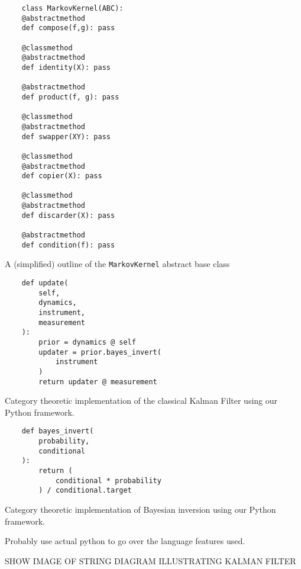 \documentclass[letterpaper, 10 pt, conference]{ieeeconf}  %
\begin{document}
\begin{listing}
\begin{verbatim}
    class MarkovKernel(ABC):
	@abstractmethod
	def compose(f,g): pass

	@classmethod
	@abstractmethod
	def identity(X): pass

	@abstractmethod
	def product(f, g): pass

	@classmethod
	@abstractmethod
	def swapper(XY): pass

	@classmethod
	@abstractmethod
	def copier(X): pass

	@classmethod
	@abstractmethod
	def discarder(X): pass

	@abstractmethod
	def condition(f): pass
\end{verbatim}
    \caption{A (simplified) outline of the \texttt{MarkovKernel} abstract base class}
\label{listing:1}
\end{listing}

\begin{listing}
\begin{verbatim}
    def update(
        self, 
        dynamics, 
        instrument, 
        measurement
    ):
        prior = dynamics @ self
        updater = prior.bayes_invert(
            instrument
        )
        return updater @ measurement
\end{verbatim}
\caption{Category theoretic implementation of the classical Kalman Filter using our Python framework.}
\label{listing:1}
\end{listing}


\begin{listing}
\begin{verbatim}
    def bayes_invert(
        probability, 
        conditional
    ):
        return (
            conditional * probability
        ) / conditional.target
\end{verbatim}
\caption{Category theoretic implementation of Bayesian inversion using our Python framework.}
\label{listing:1}
\end{listing}

Probably use actual python to go over the language features used.

SHOW IMAGE OF STRING DIAGRAM ILLUSTRATING KALMAN FILTER
\end{document}
